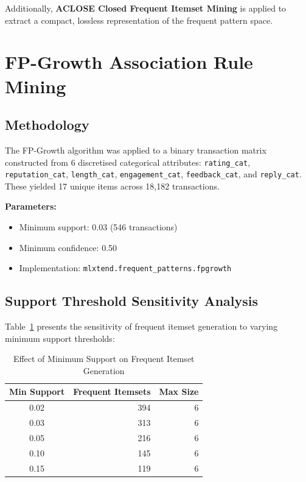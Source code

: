 \documentclass[12pt,a4paper]{article}
\begin{document}
Additionally, \textbf{ACLOSE Closed Frequent Itemset Mining} is applied to extract a compact, lossless representation of the frequent pattern space.

\section{FP-Growth Association Rule Mining}

\subsection{Methodology}

The FP-Growth algorithm was applied to a binary transaction matrix constructed from 6 discretised categorical attributes: \texttt{rating\_cat}, \texttt{reputation\_cat}, \texttt{length\_cat}, \texttt{engagement\_cat}, \texttt{feedback\_cat}, and \texttt{reply\_cat}. These yielded 17 unique items across 18{,}182 transactions.

\textbf{Parameters:}
\begin{itemize}[nosep]
    \item Minimum support: 0.03 (546 transactions)
    \item Minimum confidence: 0.50
    \item Implementation: \texttt{mlxtend.frequent\_patterns.fpgrowth}
\end{itemize}

\subsection{Support Threshold Sensitivity Analysis}

Table~\ref{tab:support_exp} presents the sensitivity of frequent itemset generation to varying minimum support thresholds:

\begin{table}[H]
\centering
\caption{Effect of Minimum Support on Frequent Itemset Generation}
\label{tab:support_exp}
\begin{tabular}{c r r}
\toprule
\textbf{Min Support} & \textbf{Frequent Itemsets} & \textbf{Max Size} \\
\midrule
0.02 & 394 & 6 \\
0.03 & 313 & 6 \\
0.05 & 216 & 6 \\
0.10 & 145 & 6 \\
0.15 & 119 & 6 \\
\bottomrule
\end{tabular}
\end{table}
\end{document}
